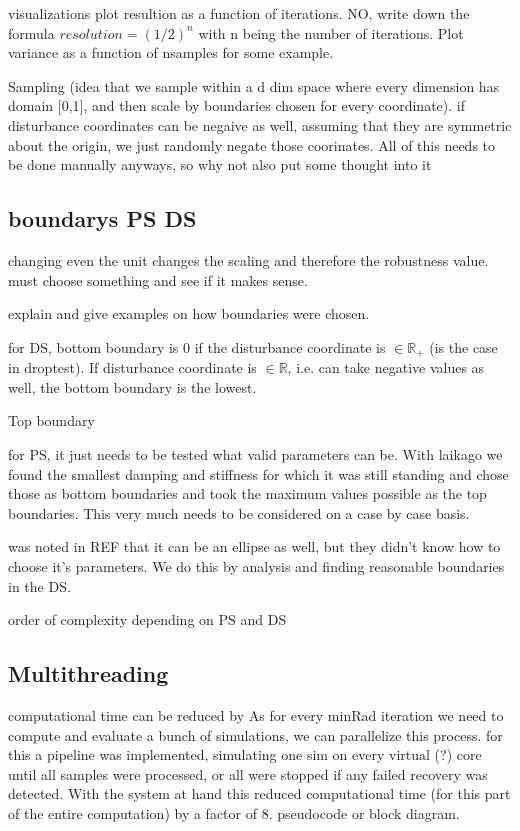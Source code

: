     visualizations
    plot resultion as a function of iterations. NO, write down the formula $resolution = (1/2)^n$ with n being the number of iterations. 
    Plot variance as a function of nsamples for some example. 

    Sampling (idea that we sample within a d dim space where every dimension has domain [0,1], and then scale by boundaries chosen for every coordinate). 
    if disturbance coordinates can be negaive as well, assuming that they are symmetric about the origin, we just randomly negate those coorinates. 
    All of this needs to be done manually anyways, so why not also put some thought into it 

\subsection{boundarys PS DS}

    changing even the unit changes the scaling and therefore the robustness value.
    must choose something and see if it makes sense. 

    explain and give examples on how boundaries were chosen. 

    for DS, bottom boundary is 0 if the disturbance coordinate is $\in \mathbb{R}_+$ (is the case in droptest). If disturbance coordinate is $\in \mathbb{R}$, i.e. can take negative values as well, the bottom boundary is the lowest. 

    Top boundary


    for PS, it just needs to be tested what valid parameters can be. With laikago we found the smallest damping and stiffness for which it was still standing and chose those as bottom boundaries and took the maximum values possible as the top boundaries. 
    This very much needs to be considered on a case by case basis. 


    was noted in REF that it can be an ellipse as well, but they didn't know how to choose it's parameters. We do this by analysis and finding reasonable boundaries in the DS.

    order of complexity depending on PS and DS

\subsection{Multithreading}

    computational time can be reduced by 
    As for every minRad iteration we need to compute and evaluate a bunch of simulations, we can parallelize this process. for this a pipeline was implemented, simulating one sim on every virtual (?) core until all samples were processed, or all were stopped if any failed recovery was detected. With the system at hand this reduced computational time (for this part of the entire computation) by a factor of 8. 
    pseudocode or block diagram.

